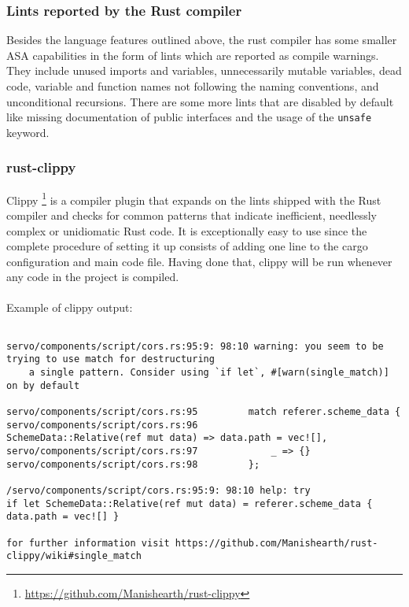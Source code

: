 \documentclass{scrartcl}
\begin{document}
\subsubsection{Lints reported by the Rust compiler}

Besides the language features outlined above, the rust compiler has some smaller ASA capabilities in the form of lints which are reported as compile warnings. They include unused imports and variables, unnecessarily mutable variables, dead code, variable and function names not following the naming conventions, and unconditional recursions. There are some more lints that are disabled by default like missing documentation of public interfaces and the usage of the \texttt{unsafe} keyword.

\subsubsection{rust-clippy}

Clippy \footnote{\url{https://github.com/Manishearth/rust-clippy}} is a compiler plugin that expands on the lints shipped with the Rust compiler and checks for common patterns that indicate inefficient, needlessly complex or unidiomatic Rust code. It is exceptionally easy to use since the complete procedure of setting it up consists of adding one line to the cargo configuration and main code file. Having done that, clippy will be run whenever any code in the project is compiled.\\
\\

Example of clippy output:
{
\scriptsize
\begin{verbatim}

servo/components/script/cors.rs:95:9: 98:10 warning: you seem to be trying to use match for destructuring
    a single pattern. Consider using `if let`, #[warn(single_match)] on by default
    
servo/components/script/cors.rs:95         match referer.scheme_data {
servo/components/script/cors.rs:96             SchemeData::Relative(ref mut data) => data.path = vec![],
servo/components/script/cors.rs:97             _ => {}
servo/components/script/cors.rs:98         };

/servo/components/script/cors.rs:95:9: 98:10 help: try
if let SchemeData::Relative(ref mut data) = referer.scheme_data { data.path = vec![] }

for further information visit https://github.com/Manishearth/rust-clippy/wiki#single_match

\end{verbatim}
}
\end{document}
